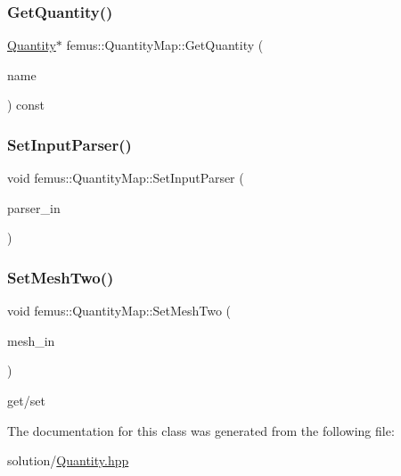 \mbox{\label{classfemus_1_1_quantity_map_a2510c3eff021fa6704888731f77b1a79}} 
\subsubsection{\texorpdfstring{Get\+Quantity()}{GetQuantity()}}
{\footnotesize\ttfamily \mbox{\hyperlink{classfemus_1_1_quantity}{Quantity}}$\ast$ femus\+::\+Quantity\+Map\+::\+Get\+Quantity (\begin{DoxyParamCaption}\item[{const std\+::string \&}]{name }\end{DoxyParamCaption}) const\hspace{0.3cm}{\ttfamily [inline]}}

\mbox{\label{classfemus_1_1_quantity_map_a607c4c523156d00c75864679d301aa05}} 
\subsubsection{\texorpdfstring{Set\+Input\+Parser()}{SetInputParser()}}
{\footnotesize\ttfamily void femus\+::\+Quantity\+Map\+::\+Set\+Input\+Parser (\begin{DoxyParamCaption}\item[{const \mbox{\hyperlink{classfemus_1_1_femus_input_parser}{Femus\+Input\+Parser}}$<$ double $>$ $\ast$}]{parser\+\_\+in }\end{DoxyParamCaption})\hspace{0.3cm}{\ttfamily [inline]}}

\mbox{\label{classfemus_1_1_quantity_map_a5e91f9c899e60ee5249e57e0f746dc2c}} 
\subsubsection{\texorpdfstring{Set\+Mesh\+Two()}{SetMeshTwo()}}
{\footnotesize\ttfamily void femus\+::\+Quantity\+Map\+::\+Set\+Mesh\+Two (\begin{DoxyParamCaption}\item[{const \mbox{\hyperlink{classfemus_1_1_multi_level_mesh_two}{Multi\+Level\+Mesh\+Two}} $\ast$}]{mesh\+\_\+in }\end{DoxyParamCaption})\hspace{0.3cm}{\ttfamily [inline]}}

get/set 

The documentation for this class was generated from the following file\+:\begin{DoxyCompactItemize}
\item 
solution/\mbox{\hyperlink{_quantity_8hpp}{Quantity.\+hpp}}\end{DoxyCompactItemize}
